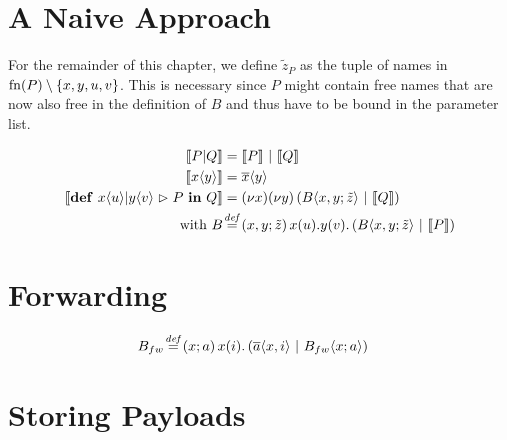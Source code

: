 \section{A Naive Approach}


For the remainder of this chapter, we define
$\tilde{z}_P$
as the tuple of names in
$\operatorname{fn}(P) \setminus {\{x, y, u, v\}}$.
This is necessary since $P$ might contain free names
that are now also free in the definition of $B$ and thus
have to be bound in the parameter list.

\begin{align*}
  \encMJtoAP{P \jpar Q}
  &= \encMJtoAP{P} \apar \encMJtoAP{Q}
  \\
  \encMJtoAP{\jsnd{x}{y}}
  &= \asnd{x}{y}
  \\
  \encMJtoAP{\jdef{\jrct{\jrcv{x}{u} \jpat \jrcv{y}{v}}{P}}{Q}}
  &= \anew{x}{\anew{y}{\parens{\ains{B}{x, y}{\tilde{z}} \apar \encMJtoAP{Q}}}}
  \\
  \text{with }
  \adef*{B}{x,y}{\tilde{z}}{\arcv{x}{u} . \arcv{y}{v} . \parens{\ains{B}{x, y}{\tilde{z}} \apar \encMJtoAP{P}}}
  \\
\end{align*}



\section{Forwarding}



\begin{align*}
  \adef*{B_{fw}}{x}{a}{\arcv{x}{i} . \parens{\asnd{a}{x,i} \apar \ains{B_{fw}}{x}{a}}}
\end{align*}

\section{Storing Payloads}


